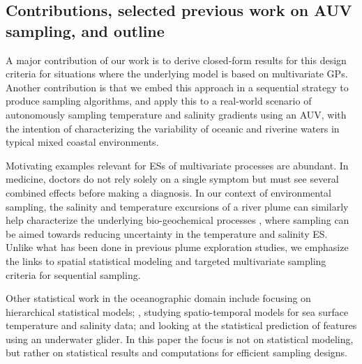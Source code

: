 \documentclass[aoas]{imsart}
\begin{document}
\subsection{Contributions, selected previous work on AUV sampling, and outline} 

A major contribution of our work is to derive closed-form results for
this design criteria for situations where the underlying model is
based on multivariate GPs. Another contribution is that we embed this
approach in a sequential strategy to produce sampling algorithms, and
apply this to a real-world scenario of autonomously sampling
temperature and salinity gradients using an AUV, with the intention of
characterizing the variability of oceanic and riverine waters in
typical mixed coastal environments.

Motivating examples relevant for ESs of multivariate processes are
abundant. In medicine, doctors do not rely solely on a single symptom
but must see several combined effects before making a diagnosis. In
our context of environmental sampling, the salinity and temperature
excursions of a river plume can similarly help characterize the
underlying bio-geochemical processes
\citep{hopkins2013detection,Pinto2018}, where sampling can be aimed
towards reducing uncertainty in the temperature and salinity ES.
Unlike what has been done in previous plume exploration studies, we
emphasize the links to spatial statistical modeling and targeted
multivariate sampling criteria for sequential sampling.

Other statistical
work in the oceanographic domain include \cite{wikle2013modern}
focusing on hierarchical statistical models; \cite{sahu2008space},
studying spatio-temporal models for sea surface temperature and
salinity data; and \cite{mellucci2018oceanic} looking at the
statistical prediction of features using an underwater glider.
In this paper the focus is not on statistical modeling, but rather on statistical results and computations for efficient sampling designs. 
\end{document}
